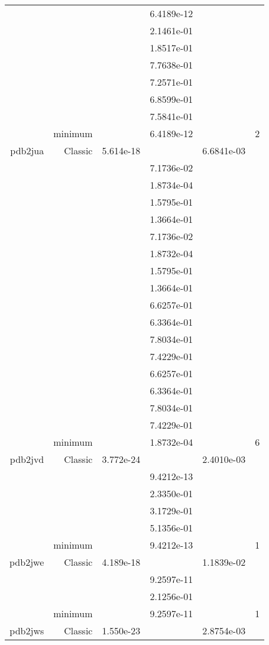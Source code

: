 \begin{xltabular}{\textwidth}{r|rS[table-format=1.3e+2]S[table-format=1.4e+2]S[table-format=1.4e+2]S[table-format=-1.5]}
&  &  & 6.4189e-12 & & \\
&  &  & 2.1461e-01 & & \\
&  &  & 1.8517e-01 & & \\
&  &  & 7.7638e-01 & & \\
&  &  & 7.2571e-01 & & \\
&  &  & 6.8599e-01 & & \\
&  &  & 7.5841e-01 & & \\
& minimum &  & 6.4189e-12 & & 2 \\  \addlinespace
pdb2jua & Classic & 5.614e-18 &  & 6.6841e-03 & \\
&  &  & 7.1736e-02 & & \\
&  &  & 1.8734e-04 & & \\
&  &  & 1.5795e-01 & & \\
&  &  & 1.3664e-01 & & \\
&  &  & 7.1736e-02 & & \\
&  &  & 1.8732e-04 & & \\
&  &  & 1.5795e-01 & & \\
&  &  & 1.3664e-01 & & \\
&  &  & 6.6257e-01 & & \\
&  &  & 6.3364e-01 & & \\
&  &  & 7.8034e-01 & & \\
&  &  & 7.4229e-01 & & \\
&  &  & 6.6257e-01 & & \\
&  &  & 6.3364e-01 & & \\
&  &  & 7.8034e-01 & & \\
&  &  & 7.4229e-01 & & \\
& minimum &  & 1.8732e-04 & & 6 \\  \addlinespace
pdb2jvd & Classic & 3.772e-24 &  & 2.4010e-03 & \\
&  &  & 9.4212e-13 & & \\
&  &  & 2.3350e-01 & & \\
&  &  & 3.1729e-01 & & \\
&  &  & 5.1356e-01 & & \\
& minimum &  & 9.4212e-13 & & 1 \\  \addlinespace
pdb2jwe & Classic & 4.189e-18 &  & 1.1839e-02 & \\
&  &  & 9.2597e-11 & & \\
&  &  & 2.1256e-01 & & \\
& minimum &  & 9.2597e-11 & & 1 \\  \addlinespace
pdb2jws & Classic & 1.550e-23 &  & 2.8754e-03 & \\

\end{xltabular}
